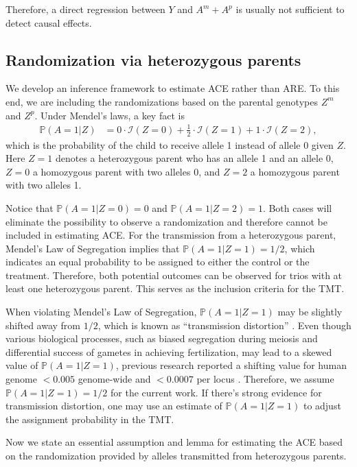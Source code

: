 \documentclass[12pt]{extarticle}
\newcommand{\pp}{\mathbb{P}}
\newcommand{\indicator}{\mathcal{I}}
\begin{document}
\noindent Therefore, a direct regression between $Y$ and $A^m+A^p$ is usually not sufficient to detect causal effects. 

\subsection{Randomization via heterozygous parents} 

We develop an inference framework to estimate ACE rather than ARE. To this end, we are including the randomizations based on the parental genotypes $Z^m$ and $Z^p$. Under Mendel's laws, a key fact is 
\begin{align*}
\pp (A=1|Z) &= 0\cdot \indicator(Z=0) + \frac{1}{2}\cdot \indicator(Z=1) + 1\cdot \indicator(Z=2),
\end{align*} which is the probability of the child to receive allele 1 instead of allele 0 given $Z$. Here $Z=1$ denotes a heterozygous parent who has an allele 1 and an allele 0, $Z=0$ a homozygous parent with two alleles 0, and $Z=2$ a homozygous parent with two alleles 1.

Notice that $\pp (A=1|Z=0) = 0$ and  $\pp (A=1|Z=2) = 1$. Both cases will eliminate the possibility to observe a randomization and therefore cannot be included in estimating ACE. For the transmission from a heterozygous parent, Mendel's Law of Segregation implies that $\pp (A=1|Z=1)=1/2$, which indicates an equal probability to be assigned to either the control or the treatment. Therefore, both potential outcomes can be observed for trios with at least one heterozygous parent. This serves as the inclusion criteria for the TMT. 

When violating Mendel's Law of Segregation, $\pp (A=1|Z=1)$ may be slightly shifted away from $1/2$, which is known as ``transmission distortion'' \citep{lemaire2000, pardo2001, zollner2004}. Even though various biological processes, such as biased segregation during meiosis and differential success of gametes in achieving fertilization, may lead to a skewed value of $\pp (A=1|Z=1)$, previous research reported a shifting value for human genome $< 0.005$ genome-wide and $< 0.0007$ per locus \citep{zollner2004}. Therefore, we assume $\pp (A=1|Z=1)=1/2$ for the current work. If there's strong evidence for transmission distortion, one may use an estimate of $\pp (A=1|Z=1)$ to adjust the assignment probability in the TMT.

Now we state an essential assumption and lemma for estimating the ACE based on the randomization provided by alleles transmitted from heterozygous parents. 
\end{document}
